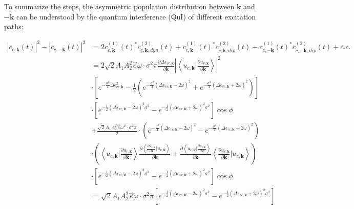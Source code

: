To summarize the steps, the asymmetric population distribution between $\mathbf k$ and $\mathbf {-k}$  can be understood by the quantum interference (\gls{QuI}) \cite{roos2003characterization} of different excitation paths:

\begin{equation}
    \begin{aligned}
    |c_{c,\mathbf k}(t)|^2-|c_{c,-\mathbf k}(t)|^2&=
 2c^{(1)}_{c,\mathbf k}(t)^* c^{(2)}_{c,\mathbf k,dyn}(t) +c^{(1)}_{c,\mathbf k}(t)^* c^{(2)}_{c,\mathbf k,dip}(t)-c^{(1)}_{c,-\mathbf k}(t)^* c^{(2)}_{c,-\mathbf k,dip}(t) + c.c.\\
 &=2\sqrt{2} A_1 A_2^2 \vec e \omega  \cdot \sigma^2 \pi \frac{\partial  \Delta \epsilon_{vc,\mathbf k}}{\partial \mathbf k} |\left \langle u_{c,\mathbf k}\Big |\frac{\partial u_{v,\mathbf k}}{\partial \mathbf k} \right \rangle|^2 \\
    &\cdot [e^{-\frac{\sigma^2}{4} \Delta \epsilon_{vc,\mathbf k} ^2}-\frac{1}{2}(e^{-\frac{\sigma^2}{4} (\Delta \epsilon_{vc,\mathbf k}-2\omega )^2}+e^{-\frac{\sigma^2}{4} (\Delta \epsilon_{vc,\mathbf k}+2\omega )^2})]\\
    &\cdot[e^{-\frac{1}2{}(\Delta \epsilon_{vc,\mathbf k} - 2\omega )^2 \sigma^2}
    -e^{-\frac{1}{2}(\Delta \epsilon_{vc,\mathbf k} + 2\omega )^2 \sigma^2} ]\cos\phi\\
    &+\frac{\sqrt{2}A_1A_2^2 \vec e \omega ^2 \cdot \sigma^2 \pi}{2}\cdot(e^{-\frac{\sigma^2}{4} (\Delta \epsilon_{vc,\mathbf k}-2\omega )^2}-e^{-\frac{\sigma^2}{4} (\Delta \epsilon_{vc,\mathbf k}+2\omega )^2})\\
    &\cdot (\left \langle u_{c,\mathbf k} \big | \frac{\partial u_{v,\mathbf k}}{\partial \mathbf k}  \right \rangle \frac{\partial{\left \langle\frac{\partial u_{v,\mathbf k}}{\partial \mathbf k}\Big |u_{c,\mathbf k}\right \rangle}}{\partial {\mathbf k}} +
   \frac{\partial{\left \langle u_{c,\mathbf k}\Big |\frac{\partial u_{v,\mathbf k}}{\partial \mathbf k} \right \rangle}}{\partial {\mathbf k}}
    \left \langle \frac{\partial u_{v,\mathbf k}}{\partial \mathbf k} |  u_{c,\mathbf k} \right \rangle)\\
    &\cdot[e^{-\frac{1}{2}(\Delta \epsilon_{vc,\mathbf k} - 2\omega )^2 \sigma^2}
    -e^{-\frac{1}{2}(\Delta \epsilon_{vc,\mathbf k} + 2\omega )^2 \sigma^2} ]\cos\phi\\
    &=\sqrt{2} A_1 A_2^2 \vec e \omega  \cdot \sigma^2 \pi [e^{-\frac{1}2{}(\Delta \epsilon_{vc,\mathbf k} - 2\omega )^2 \sigma^2}
    -e^{-\frac{1}{2}(\Delta \epsilon_{vc,\mathbf k} + 2\omega )^2 \sigma^2} ]\\

\end{aligned}
\end{equation}
